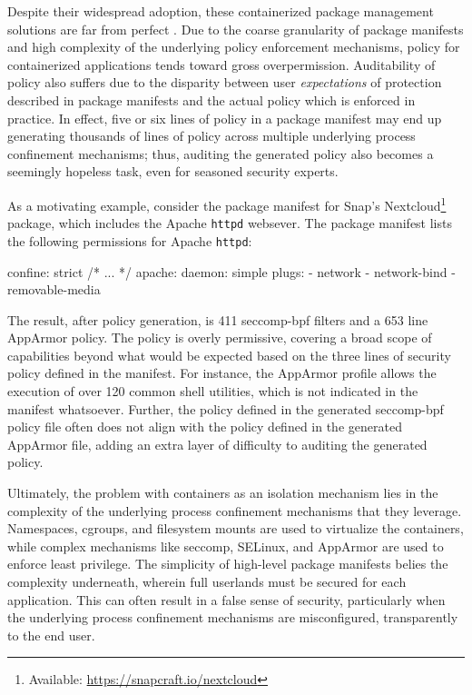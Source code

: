 \documentclass[dvipsnames, 12pt]{article}
\begin{document}
Despite their widespread adoption, these containerized package management
solutions are far from perfect \cite{sultan2019_container_security}. Due to the
coarse granularity of package manifests and high complexity of the underlying
policy enforcement mechanisms, policy for containerized applications tends
toward gross overpermission. Auditability of policy also suffers due to the
disparity between user \textit{expectations} of protection described in package
manifests and the actual policy which is enforced in practice. In effect, five
or six lines of policy in a package manifest may end up generating thousands of
lines of policy across multiple underlying process confinement mechanisms; thus,
auditing the generated policy also becomes a seemingly hopeless task, even for
seasoned security experts.

As a motivating example, consider the package manifest for Snap's
Nextcloud\footnote{Available: \url{https://snapcraft.io/nextcloud}} package, which includes
the Apache \texttt{httpd} websever. The package manifest lists the following
permissions for Apache \texttt{httpd}:

\begin{listing}[language=yaml]
confine: strict
/* ... */
apache:
  daemon: simple
  plugs:
  - network
  - network-bind
  - removable-media
\end{listing}

The result, after policy generation, is 411 seccomp-bpf filters and a 653 line
AppArmor policy. The policy is overly permissive, covering a broad scope of
capabilities beyond what would be expected based on the three lines of security
policy defined in the manifest. For instance, the AppArmor profile allows the
execution of over 120 common shell utilities, which is not indicated in the
manifest whatsoever. Further, the policy defined in the generated seccomp-bpf
policy file often does not align with the policy defined in the generated
AppArmor file, adding an extra layer of difficulty to auditing the generated
policy.

Ultimately, the problem with containers as an isolation mechanism lies in the
complexity of the underlying process confinement mechanisms that they leverage.
Namespaces, cgroups, and filesystem mounts are used to virtualize the
containers, while complex mechanisms like seccomp, SELinux, and AppArmor are
used to enforce least privilege. The simplicity of high-level package manifests
belies the complexity underneath, wherein full userlands must be secured for
each application. This can often result in a false sense of security,
particularly when the underlying process confinement mechanisms are
misconfigured, transparently to the end user.
\end{document}
